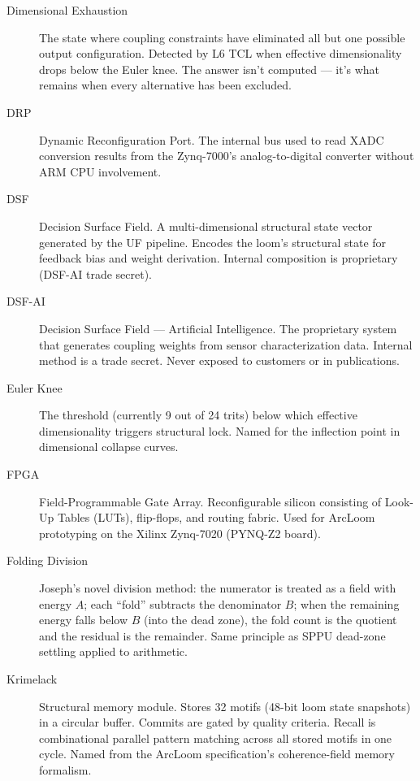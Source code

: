 \documentclass[11pt,a4paper]{article}
\begin{document}
\begin{description}
\item[Dimensional Exhaustion] The state where coupling constraints have eliminated all but one possible output configuration. Detected by L6 TCL when effective dimensionality drops below the Euler knee. The answer isn't computed --- it's what remains when every alternative has been excluded.

\item[DRP] Dynamic Reconfiguration Port. The internal bus used to read XADC conversion results from the Zynq-7000's analog-to-digital converter without ARM CPU involvement.

\item[DSF] Decision Surface Field. A multi-dimensional structural state vector generated by the UF pipeline. Encodes the loom's structural state for feedback bias and weight derivation. Internal composition is proprietary (DSF-AI trade secret).

\item[DSF-AI] Decision Surface Field --- Artificial Intelligence. The proprietary system that generates coupling weights from sensor characterization data. Internal method is a trade secret. Never exposed to customers or in publications.

\item[Euler Knee] The threshold (currently 9 out of 24 trits) below which effective dimensionality triggers structural lock. Named for the inflection point in dimensional collapse curves.

\item[FPGA] Field-Programmable Gate Array. Reconfigurable silicon consisting of Look-Up Tables (LUTs), flip-flops, and routing fabric. Used for ArcLoom prototyping on the Xilinx Zynq-7020 (PYNQ-Z2 board).

\item[Folding Division] Joseph's novel division method: the numerator is treated as a field with energy $A$; each ``fold'' subtracts the denominator $B$; when the remaining energy falls below $B$ (into the dead zone), the fold count is the quotient and the residual is the remainder. Same principle as SPPU dead-zone settling applied to arithmetic.

\item[Krimelack] Structural memory module. Stores 32 motifs (48-bit loom state snapshots) in a circular buffer. Commits are gated by quality criteria. Recall is combinational parallel pattern matching across all stored motifs in one cycle. Named from the ArcLoom specification's coherence-field memory formalism.



\end{description}
\end{document}
